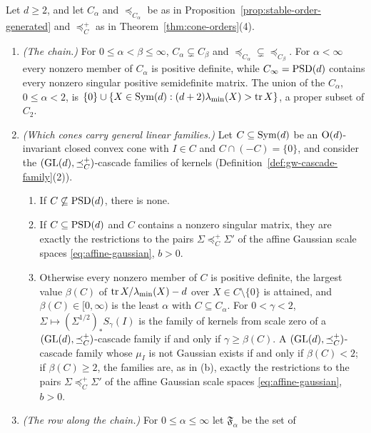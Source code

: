 \begin{theorem}\label{thm:wedge-axis}
Let $d \ge 2$, and let $C_\alpha$ and $\preceq_{C_\alpha}$ be as in Proposition~\ref{prop:stable-order-generated} and
$\preceq^+_C$ as in Theorem~\ref{thm:cone-orders}(4).
\begin{enumerate}
\item \emph{(The chain.)} For $0 \le \alpha < \beta \le \infty$, $C_\alpha \subsetneq C_\beta$ and
$\preceq_{C_\alpha} \subsetneq \preceq_{C_\beta}$. For $\alpha < \infty$ every nonzero member of $C_\alpha$ is positive
definite, while $C_\infty = \mathrm{PSD}(d)$ contains every nonzero singular positive semidefinite matrix. The union of
the $C_\alpha$, $0 \le \alpha < 2$, is $\{0\} \cup \{X \in \mathrm{Sym}(d) : (d+2)\lambda_{\min}(X) > \operatorname{tr} X\}$, a proper
subset of $C_2$.
\item \emph{(Which cones carry general linear families.)} Let $C \subseteq \mathrm{Sym}(d)$ be an $\mathrm{O}(d)$-invariant
closed convex cone with $I \in C$ and $C \cap (-C) = \{0\}$, and consider the
$(\mathrm{GL}(d), \preceq^+_C)$-cascade families of kernels (Definition~\ref{def:gw-cascade-family}(2)).
\begin{enumerate}
\item[(a)] If $C \not\subseteq \mathrm{PSD}(d)$, there is none.
\item[(b)] If $C \subseteq \mathrm{PSD}(d)$ and $C$ contains a nonzero singular matrix, they are exactly the
restrictions to the pairs $\Sigma \preceq^+_C \Sigma'$ of the affine Gaussian scale spaces
\ref{eq:affine-gaussian}, $b > 0$.
\item[(c)] Otherwise every nonzero member of $C$ is positive definite, the largest value $\beta(C)$ of
$\operatorname{tr} X/\lambda_{\min}(X) - d$ over $X \in C \setminus \{0\}$ is attained, and $\beta(C) \in [0, \infty)$ is the
least $\alpha$ with $C \subseteq C_\alpha$. For $0 < \gamma < 2$, $\Sigma \mapsto (\Sigma^{1/2})_*S_\gamma(I)$
is the family of kernels from scale zero of a $(\mathrm{GL}(d), \preceq^+_C)$-cascade family if and only if
$\gamma \ge \beta(C)$. A $(\mathrm{GL}(d), \preceq^+_C)$-cascade family whose $\mu_I$ is not Gaussian exists if and only
if $\beta(C) < 2$; if $\beta(C) \ge 2$, the families are, as in (b), exactly the restrictions to the pairs
$\Sigma \preceq^+_C \Sigma'$ of the affine Gaussian scale spaces \ref{eq:affine-gaussian}, $b > 0$.
\end{enumerate}
\item \emph{(The row along the chain.)} For $0 \le \alpha \le \infty$ let $\mathfrak F_\alpha$ be the set of

\end{enumerate}
\end{theorem}
